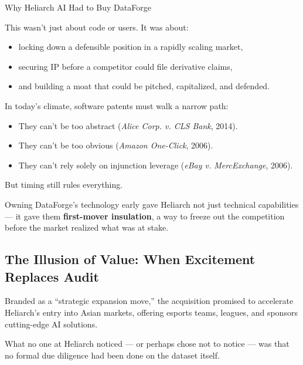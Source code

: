 \begin{HistoricalSidebar}{Why Heliarch AI Had to Buy DataForge}
    \medskip
    
    This wasn’t just about code or users. It was about:

    \medskip

    \begin{itemize}
    \item locking down a defensible position in a rapidly scaling market,
    \item securing IP before a competitor could file derivative claims,
    \item and building a moat that could be pitched, capitalized, and defended.
    \end{itemize}
    
    \medskip
    
    In today’s climate, software patents must walk a narrow path:

    \medskip

    \begin{itemize}
    \item They can’t be too abstract (\textit{Alice Corp. v. CLS Bank}, 2014).
    \item They can’t be too obvious (\textit{Amazon One-Click}, 2006).
    \item They can’t rely solely on injunction leverage (\textit{eBay v. MercExchange}, 2006).
    \end{itemize}

    \medskip
    
    But timing still rules everything.

    \medskip
    
    Owning DataForge’s technology early gave Heliarch not just technical capabilities — it gave them \textbf{first-mover insulation}, a way to freeze out the competition before the market realized what was at stake.
    
\end{HistoricalSidebar}


\subsection{The Illusion of Value: When Excitement Replaces Audit}

Branded as a “strategic expansion move,” the acquisition promised to accelerate Heliarch’s entry into Asian markets, offering esports teams, leagues, and sponsors cutting-edge AI solutions.

What no one at Heliarch noticed --- or perhaps chose not to notice --- was that no formal due diligence had been done on the dataset itself.

